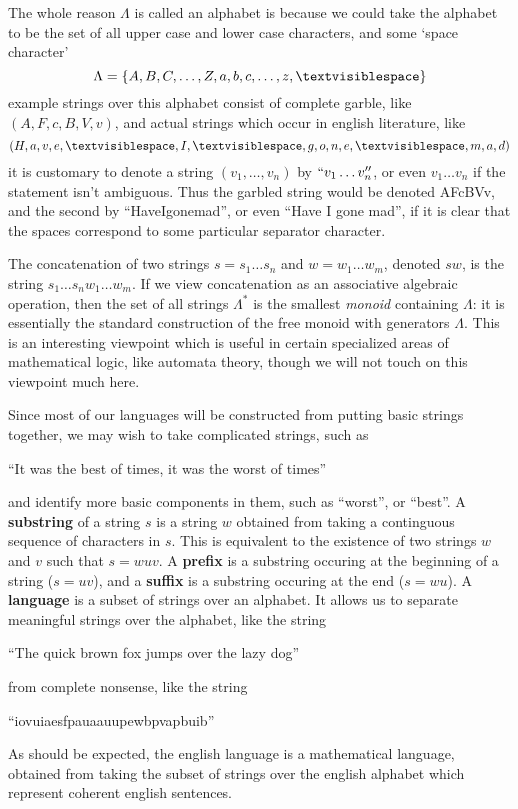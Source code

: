 \begin{example}
    The whole reason $\Lambda$ is called an alphabet is because we could take the alphabet to be the set of all upper case and lower case characters, and some `space character'
    \[ \Lambda = \{ A,B,C,\dots,Z, a,b,c,\dots,z,\textvisiblespace \} \]
    example strings over this alphabet consist of complete garble, like $(A,F,c,B,V,v)$, and actual strings which occur in english literature, like
    \[ (H,a,v,e,\textvisiblespace,I,\textvisiblespace,g,o,n,e,\textvisiblespace,m,a,d) \]
    it is customary to denote a string $(v_1, \dots, v_n)$ by $``v_1 \dots v_n''$, or even $v_1 \dots v_n$ if the statement isn't ambiguous. Thus the garbled string would be denoted AFcBVv, and the second by ``Have\textvisiblespace I\textvisiblespace gone\textvisiblespace mad'', or even ``Have I gone mad'', if it is clear that the spaces correspond to some particular separator character.
\end{example}

The concatenation of two strings $s = s_1 \dots s_n$ and $w = w_1 \dots w_m$, denoted $sw$, is the string $s_1 \dots s_n w_1 \dots w_m$. If we view concatenation as an associative algebraic operation, then the set of all strings $\Lambda^*$ is the smallest {\it monoid} containing $\Lambda$: it is essentially the standard construction of the free monoid with generators $\Lambda$. This is an interesting viewpoint which is useful in certain specialized areas of mathematical logic, like automata theory, though we will not touch on this viewpoint much here.

Since most of our languages will be constructed from putting basic strings together, we may wish to take complicated strings, such as
%
\begin{center}
    ``It was the best of times, it was the worst of times''
\end{center}
%
and identify more basic components in them, such as ``worst'', or ``best''. A {\bf substring} of a string $s$ is a string $w$ obtained from taking a continguous sequence of characters in $s$. This is equivalent to the existence of two strings $w$ and $v$ such that $s = wuv$. A {\bf prefix} is a substring occuring at the beginning of a string ($s = uv$), and a {\bf suffix} is a substring occuring at the end ($s = wu$). A {\bf language} is a subset of strings over an alphabet. It allows us to separate meaningful strings over the alphabet, like the string
%
\begin{center}
    ``The quick brown fox jumps over the lazy dog''
\end{center}
%
from complete nonsense, like the string
%
\begin{center}
    ``iovuiaesfpauaauupewbpvapbuib''
\end{center}
%
As should be expected, the english language is a mathematical language, obtained from taking the subset of strings over the english alphabet which represent coherent english sentences.


